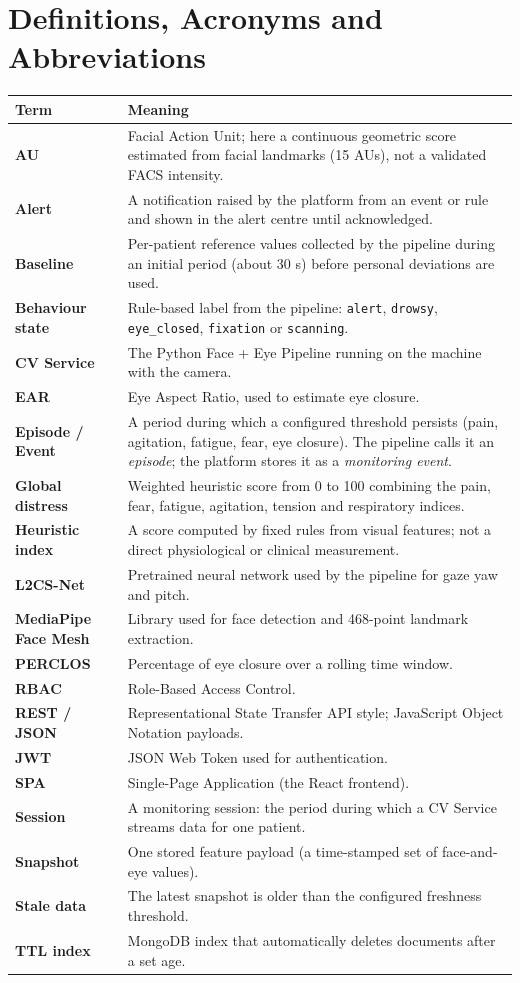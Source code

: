 \documentclass[a4paper,11pt]{scrreprt}
\newcommand{\code}[1]{\texttt{#1}}
\begin{document}
\section{Definitions, Acronyms and Abbreviations}
\begin{longtable}{@{}>{\bfseries}p{3.1cm}p{12.4cm}@{}}
\toprule Term & Meaning\\ \midrule \endhead
AU & Facial Action Unit; here a continuous geometric score estimated from facial landmarks (15 AUs), not a validated FACS intensity.\\
Alert & A notification raised by the platform from an event or rule and shown in the alert centre until acknowledged.\\
Baseline & Per-patient reference values collected by the pipeline during an initial period (about 30 s) before personal deviations are used.\\
Behaviour state & Rule-based label from the pipeline: \code{alert}, \code{drowsy}, \code{eye_closed}, \code{fixation} or \code{scanning}.\\
CV Service & The Python Face + Eye Pipeline running on the machine with the camera.\\
EAR & Eye Aspect Ratio, used to estimate eye closure.\\
Episode / Event & A period during which a configured threshold persists (pain, agitation, fatigue, fear, eye closure). The pipeline calls it an \emph{episode}; the platform stores it as a \emph{monitoring event}.\\
Global distress & Weighted heuristic score from 0 to 100 combining the pain, fear, fatigue, agitation, tension and respiratory indices.\\
Heuristic index & A score computed by fixed rules from visual features; not a direct physiological or clinical measurement.\\
L2CS-Net & Pretrained neural network used by the pipeline for gaze yaw and pitch.\\
MediaPipe Face Mesh & Library used for face detection and 468-point landmark extraction.\\
PERCLOS & Percentage of eye closure over a rolling time window.\\
RBAC & Role-Based Access Control.\\
REST / JSON & Representational State Transfer API style; JavaScript Object Notation payloads.\\
JWT & JSON Web Token used for authentication.\\
SPA & Single-Page Application (the React frontend).\\
Session & A monitoring session: the period during which a CV Service streams data for one patient.\\
Snapshot & One stored feature payload (a time-stamped set of face-and-eye values).\\
Stale data & The latest snapshot is older than the configured freshness threshold.\\
TTL index & MongoDB index that automatically deletes documents after a set age.\\
\bottomrule
\end{longtable}
\end{document}
